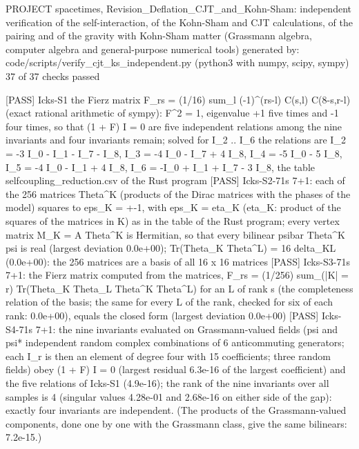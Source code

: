 \documentclass[
  10pt,
]{article}
\newenvironment{Shaded}{}{}
\newcommand{\NormalTok}[1]{#1}
\begin{document}
\begin{Shaded}
\begin{Highlighting}[]
\NormalTok{PROJECT spacetimes, Revision\_Deflation\_CJT\_and\_Kohn{-}Sham: independent verification of the self{-}interaction, of the Kohn{-}Sham and CJT calculations, of the pairing and of the gravity with Kohn{-}Sham matter (Grassmann algebra, computer algebra and general{-}purpose numerical tools)}
\NormalTok{generated by: code/scripts/verify\_cjt\_ks\_independent.py (python3 with numpy, scipy, sympy)}
\NormalTok{37 of 37 checks passed}

\NormalTok{[PASS] Icks{-}S1  the Fierz matrix F\_rs = (1/16) sum\_l ({-}1)\^{}(rs{-}l) C(s,l) C(8{-}s,r{-}l) (exact rational arithmetic of sympy): F\^{}2 = 1, eigenvalue +1 five times and {-}1 four times, so that (1 + F) I = 0 are five independent relations among the nine invariants and four invariants remain; solved for I\_2 .. I\_6 the relations are I\_2 = {-}3 I\_0 {-} I\_1 {-} I\_7 {-} I\_8, I\_3 = {-}4 I\_0 {-} I\_7 + 4 I\_8, I\_4 = {-}5 I\_0 {-} 5 I\_8, I\_5 = {-}4 I\_0 {-} I\_1 + 4 I\_8, I\_6 = {-}I\_0 + I\_1 + I\_7 {-} 3 I\_8, the table selfcoupling\_reduction.csv of the Rust program}
\NormalTok{[PASS] Icks{-}S2{-}71s  7+1: each of the 256 matrices Theta\^{}K (products of the Dirac matrices with the phases of the model) squares to eps\_K = +{-}1, with eps\_K = eta\_K (eta\_K: product of the squares of the matrices in K) as in the table of the Rust program; every vertex matrix M\_K = A Theta\^{}K is Hermitian, so that every bilinear psibar Theta\^{}K psi is real (largest deviation 0.0e+00); Tr(Theta\_K Theta\^{}L) = 16 delta\_KL (0.0e+00): the 256 matrices are a basis of all 16 x 16 matrices}
\NormalTok{[PASS] Icks{-}S3{-}71s  7+1: the Fierz matrix computed from the matrices, F\_rs = (1/256) sum\_(|K| = r) Tr(Theta\_K Theta\_L Theta\^{}K Theta\^{}L) for an L of rank s (the completeness relation of the basis; the same for every L of the rank, checked for six of each rank: 0.0e+00), equals the closed form (largest deviation 0.0e+00)}
\NormalTok{[PASS] Icks{-}S4{-}71s  7+1: the nine invariants evaluated on Grassmann{-}valued fields (psi and psi* independent random complex combinations of 6 anticommuting generators; each I\_r is then an element of degree four with 15 coefficients; three random fields) obey (1 + F) I = 0 (largest residual 6.3e{-}16 of the largest coefficient) and the five relations of Icks{-}S1 (4.9e{-}16); the rank of the nine invariants over all samples is 4 (singular values 4.28e{-}01 and 2.68e{-}16 on either side of the gap): exactly four invariants are independent. (The products of the Grassmann{-}valued components, done one by one with the Grassmann class, give the same bilinears: 7.2e{-}15.)}

\end{Highlighting}
\end{Shaded}
\end{document}
